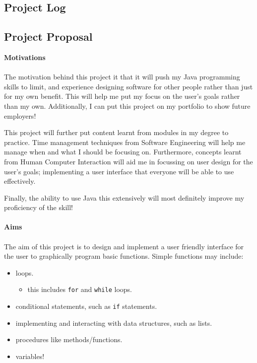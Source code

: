 \documentclass[a4paper, 12pt]{article}
\begin{document}
    \clearpage
        \subsection{Project Log}
            \textbf{}

        \clearpage
        \subsection{Project Proposal}
            \textbf{Motivations} \\\\    
            The motivation behind this project it that it will push my Java programming
            skills to limit, and experience designing software for other people rather
            than just for my own benefit. This will help me put my focus on the user's
            goals rather than my own. Additionally, I can put this project on my portfolio
            to show future employers!

            This project will further put content learnt from modules in my degree to                practice. Time management techniques from Software Engineering will help me
            manage when and what I should be focusing on. Furthermore, concepts learnt
            from Human Computer Interaction will aid me in focussing on user design for
            the user's goals; implementing a user interface that everyone will be able to
            use effectively.
        
            Finally, the ability to use Java this extensively will most definitely improve
            my proficiency of the skill! \\\\
            \textbf{Aims} \\\\
            The aim of this project is to design and implement a user friendly interface for
            the user to graphically program basic functions. Simple functions may include:
            \begin{itemize}
                \item loops.
                \begin{itemize}
                    \item this includes \texttt{for} and \texttt{while} loops.
                \end{itemize}
                \item conditional statements, such as \texttt{if} statements.
                \item implementing and interacting with data structures, such as lists.
                \item procedures like methods/functions.
                \item variables!
            \end{itemize}
            
\end{document}
